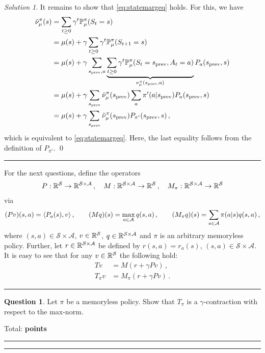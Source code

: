 \documentclass{article}
\DeclareMathOperator*{\1}{\mathbbm{1}}
\newcounter{DocPoints} %
\newcounter{QuestionPoints} %
\newcommand{\tpoints}[1]{        %
	\ifthenelse{\isempty{#1}}%
	{%
	}%
	{%
		\addtocounter{DocPoints}{#1}
		\addtocounter{QuestionPoints}{#1}
	}													 %
	\par\mbox{}\par\noindent\hfill {Total: \bf \arabic{QuestionPoints}\xspace points}\par\mbox{}\par\hrule\hrule
	\setcounter{QuestionPoints}{0}
}
\theoremstyle{definition}
\newtheorem{question}{Question}
\theoremstyle{remark}
\newtheorem*{solution*}{Solution}
\newcommand{\cS}{\mathcal{S}}
\newcommand{\cA}{\mathcal{A}}
\begin{document}
\begin{solution*}
It remains to show that \eqref{eq:statemargeq} holds. For this, we have
\begin{align*}
\tilde \nu_\mu^\pi(s)
& = \sum_{t\ge 0} \gamma^t \mathbb{P}_\mu^\pi(S_t=s) \\
& = \mu(s) + \gamma \sum_{t\ge 0} \gamma^t \mathbb{P}_\mu^\pi(S_{t+1}=s) \\
& = \mu(s) + \gamma \sum_{s_{\text{prev}},a} \underbrace{\sum_{t\ge 0} \gamma^t \mathbb{P}_\mu^\pi(S_{t}=s_{\text{prev}},A_t=a)}_{\nu_\mu^\pi(s_{\text{prev}},a)} P_{a}(s_{\text{prev}},s) \\
& = \mu(s) + \gamma \sum_{s_{\text{prev}}} \tilde \nu_\mu^\pi(s_{\text{prev}}) \sum_a \pi'(a|s_{\text{prev}}) P_{a}(s_{\text{prev}},s) \\
& = \mu(s) + \gamma \sum_{s_{\text{prev}}} \tilde \nu_\mu^\pi(s_{\text{prev}}) P_{\pi'}(s_{\text{prev}},s)\,,
\end{align*}
which is equivalent to \eqref{eq:statemargeq}. Here, the last equality follows from 
the definition of $P_{\pi'}$.
\qed\par\smallskip\hrule
\end{solution*}

For the next questions, define the operators
\begin{align*}
P:\RR^\cS \to \RR^{\cS \times\cA}\,, \quad
M:\RR^{\cS \times \cA} \to \RR^{\cS}\,, \quad
M_\pi:\RR^{\cS \times \cA} \to \RR^{\cS}
\end{align*}
via
\begin{align*}
(P v)(s,a) = \ip{P_a(s),v}\,, \qquad 
(M q)(s) = \max_{a\in \cA} q(s,a)\,, \qquad 
(M_\pi q)(s) = \sum_{a\in \cA} \pi(a|s)q(s,a)\,,
\end{align*}
where $(s,a)\in \cS \times \cA$, $v\in \RR^{\cS}$, $q\in \RR^{\cS\times \cA}$
and $\pi$ is an arbitrary memoryless policy.
Further,
let $r\in \RR^{\cS\times \cA}$ be defined by $r(s,a) = r_a(s)$, $(s,a)\in \cS \times \cA$.
It is easy to see that for any $v\in \RR^{\cS}$ the following hold:
\begin{align}
T v & = M(r+\gamma P v)\,, \label{eq:tdec} \\
T_\pi v &= M_\pi (r+\gamma P v)\,. \label{eq:tpidec} 
\end{align}

\par\hrule

\begin{question}
Let $\pi$ be a memoryless policy. Show that $T_\pi$ is a $\gamma$-contraction with respect to the max-norm.
\tpoints{5}
\end{question}
\end{document}
